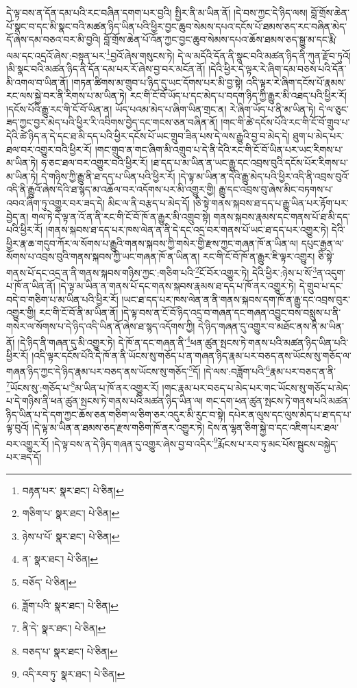 དེ་ལྟ་བས་ན་དོན་དམ་པའི་རང་བཞིན་དགག་པར་བྱའི། སྤྱིར་ནི་མ་ཡིན་ནོ། །དེ་བས་ཀྱང་དེ་ཉིད་ལས། བློ་གྲོས་ཆེན་པོ་སྣང་བ་དང་མི་སྣང་བའི་མཚན་ཉིད་ཡིན་པའི་ཕྱིར་བྱང་ཆུབ་སེམས་དཔའ་དངོས་པོ་ཐམས་ཅད་རང་བཞིན་མེད་དོ་ཞེས་དམ་བཅའ་བར་མི་བྱའི། བློ་གྲོས་ཆེན་པོ་འོན་ཀྱང་བྱང་ཆུབ་སེམས་དཔའ་ཆོས་ཐམས་ཅད་སྒྱུ་མ་དང་རྨི་ལམ་དང་འདྲའོ་ཞེས་:བསྟན་པར་\footnote{བརྟན་པར་  སྣར་ཐང་།  པེ་ཅིན། }བྱའོ་ཞེས་གསུངས་ཏེ། དེ་ལ་མདོའི་དོན་ནི་སྣང་བའི་མཚན་ཉིད་ནི་ཀུན་རྫོབ་ཏུའོ། །མི་སྣང་བའི་མཚན་ཉིད་ནི་དོན་དམ་པར་རོ་ཞེས་བྱ་བར་མངོན་ནོ། །དེའི་ཕྱིར་དེ་ལྟར་རེ་ཞིག་དམ་བཅས་པའི་དོན་མི་འགལ་བ་ཡིན་ནོ། །གཏན་ཚིགས་མ་གྲུབ་པ་ཉིད་དུ་ཡང་དོགས་པར་མི་བྱ་སྟེ། འདི་ལྟར་རེ་ཞིག་དངོས་པོ་རྣམས་རང་ལས་སྐྱེ་བར་ནི་རིགས་པ་མ་ཡིན་ཏེ། རང་གི་ངོ་བོ་ཡོད་པ་དང་མེད་པ་བདག་ཉིད་ཀྱི་རྒྱུར་མི་འཐད་པའི་ཕྱིར་རོ། །དངོས་པོའི་རྒྱུ་རང་གི་ངོ་བོ་ཡིན་ན། ཡོད་པའམ་མེད་པ་ཞིག་ཡིན་གྲང་ན། རེ་ཞིག་ཡོད་པ་ནི་མ་ཡིན་ཏེ། དེ་ལ་ཅུང་ཟད་ཀྱང་བྱར་མེད་པའི་ཕྱིར་རི་འབིགས་བྱེད་དང་གངས་ཅན་བཞིན་ནོ། །གང་གི་ཚེ་དངོས་པོའི་རང་གི་ངོ་བོ་གྲུབ་པ་དེའི་ཚེ་ཉིད་ན་དེ་དང་ཐ་མི་དད་པའི་ཕྱིར་དངོས་པོ་ཡང་གྲུབ་ཟིན་པས་དེ་ལས་རྒྱུའི་བྱ་བ་མེད་དེ། ཐུག་པ་མེད་པར་ཐལ་བར་འགྱུར་བའི་ཕྱིར་རོ། །གང་གྲུབ་ན་གང་ཞིག་མི་འགྲུབ་པ་དེ་ནི་དེའི་རང་གི་ངོ་བོ་ཡིན་པར་ཡང་རིགས་པ་མ་ཡིན་ཏེ། ཧ་ཅང་ཐལ་བར་འགྱུར་བའི་ཕྱིར་རོ། །ཐ་དད་པ་མ་ཡིན་ན་ཡང་རྒྱུ་དང་འབྲས་བུའི་དངོས་པོར་རིགས་པ་མ་ཡིན་ཏེ། དེ་གཉིས་ཀྱི་རྒྱུ་ནི་ཐ་དད་པ་ཡིན་པའི་ཕྱིར་རོ། །དེ་ལྟ་མ་ཡིན་ན་དེའི་རྒྱུ་མེད་པའི་ཕྱིར་འདི་ནི་འབྲས་བུའོ་འདི་ནི་རྒྱུའོ་ཞེས་དེའི་ཐ་སྙད་མ་འཆོལ་བར་འདོགས་པར་མི་འགྱུར་གྱི། རྒྱུ་དང་འབྲས་བུ་ཞེས་མིང་བཏགས་པ་འབའ་ཞིག་ཏུ་འགྱུར་བར་ཟད་དེ། མིང་ལ་ནི་བརྩད་པ་མེད་དོ། །ཅི་སྟེ་གནས་སྐབས་ཐ་དད་པ་རྒྱུ་ཡིན་པར་རྟོག་པར་བྱེད་ན། གལ་ཏེ་དེ་ལྟ་ན་འོ་ན་ནི་རང་གི་ངོ་བོ་ཁོ་ན་རྒྱུར་མི་འགྲུབ་སྟེ། གནས་སྐབས་རྣམས་དང་གནས་པོ་ཐ་མི་དད་པའི་ཕྱིར་རོ། །གནས་སྐབས་ཐ་དད་པར་ཁས་ལེན་ན་ནི་དེ་དང་འདྲ་བར་གནས་པོ་ཡང་ཐ་དད་པར་འགྱུར་ཏེ། དེའི་ཕྱིར་རྣ་ཆ་གདུབ་ཀོར་ལ་སོགས་པ་རྒྱུའི་གནས་སྐབས་ཀྱི་གསེར་གྱི་རྫས་ཀྱང་གཞན་ཁོ་ན་ཡིན་ལ། དཔུང་རྒྱན་ལ་སོགས་པ་འབྲས་བུའི་གནས་སྐབས་ཀྱི་ཡང་གཞན་ཁོ་ན་ཡིན་ན། རང་གི་ངོ་བོ་ཁོ་ན་རྒྱུར་ཇི་ལྟར་འགྱུར། ཅི་སྟེ་གནས་པོ་དང་འདྲ་ན་ནི་གནས་སྐབས་གཉིས་ཀྱང་:གཅིག་པའི་\footnote{གཅིག་པ་  སྣར་ཐང་།  པེ་ཅིན། }ངོ་བོར་འགྱུར་ཏེ། དེའི་ཕྱིར་:ཉེས་པ་སོ་\footnote{ཉེས་པ་པོ་  སྣར་ཐང་།  པེ་ཅིན། }ན་འདུག་པ་ཁོ་ན་ཡིན་ནོ། །དེ་ལྟ་མ་ཡིན་ན་གནས་པོ་དང་གནས་སྐབས་རྣམས་ཐ་དད་པ་ཁོ་ནར་འགྱུར་ཏེ། དེ་གྲུབ་པ་དང་བདེ་བ་གཅིག་པ་མ་ཡིན་པའི་ཕྱིར་རོ། །ཡང་ཐ་དད་པར་ཁས་ལེན་ན་ནི་གནས་སྐབས་དག་ཁོ་ན་རྒྱུ་དང་འབྲས་བུར་འགྱུར་གྱི། རང་གི་ངོ་བོ་ནི་མ་ཡིན་ནོ། །དེ་ལྟ་བས་ན་ངོ་བོ་ཉིད་འདྲ་བ་གཞན་དང་གཞན་འབྱུང་བས་བསླུས་པ་ནི་གསེར་ལ་སོགས་པ་དེ་ཉིད་འདི་ཡིན་ནོ་ཞེས་ཐ་སྙད་འདོགས་ཀྱི། དེ་ཉིད་གཞན་དུ་འགྱུར་བ་མཐོང་ནས་ནི་མ་ཡིན་ནོ། །དེ་ཉིད་ནི་གཞན་དུ་མི་འགྱུར་ཏེ། དེ་ཁོ་ན་དང་གཞན་ནི་\footnote{ན་  སྣར་ཐང་།  པེ་ཅིན། }ཕན་ཚུན་སྤངས་ཏེ་གནས་པའི་མཚན་ཉིད་ཡིན་པའི་ཕྱིར་རོ། །འདི་ལྟར་དངོས་པོའི་དེ་ཁོ་ན་ནི་ཡོངས་སུ་གཅོད་པ་ན་གཞན་ཉིད་རྣམ་པར་བཅད་ནས་ཡོངས་སུ་གཅོད་ལ་གཞན་ཉིད་ཀྱང་དེ་ཉིད་རྣམ་པར་བཅད་ནས་ཡོངས་སུ་གཅོད་\footnote{བཅོད་  པེ་ཅིན། }དོ། །དེ་ལས་:བཟློག་པའི་\footnote{ཟློག་པའི་  སྣར་ཐང་།  པེ་ཅིན། }རྣམ་པར་བཅད་ན་ནི་\footnote{ནི་དེ་  སྣར་ཐང་།  པེ་ཅིན། }ཡོངས་སུ་:གཅོད་པ་\footnote{བཅད་པ་  སྣར་ཐང་།  པེ་ཅིན། }མ་ཡིན་པ་ཁོ་ནར་འགྱུར་རོ། །གང་རྣམ་པར་བཅད་པ་མེད་པར་གང་ཡོངས་སུ་གཅོད་པ་མེད་པ་དེ་གཉིས་ནི་ཕན་ཚུན་སྤངས་ཏེ་གནས་པའི་མཚན་ཉིད་ཡིན་ལ། གང་དག་ཕན་ཚུན་སྤངས་ཏེ་གནས་པའི་མཚན་ཉིད་ཡིན་པ་དེ་དག་ཀྱང་ཆོས་ཅན་གཅིག་ལ་ཅིག་ཅར་འདུར་མི་རུང་བ་སྟེ། དཔེར་ན་ལུས་དང་ལུས་མེད་པ་ཐ་དད་པ་ལྟ་བུའོ། །དེ་ལྟ་མ་ཡིན་ན་ཐམས་ཅད་རྫས་གཅིག་ཁོ་ནར་འགྱུར་ཏེ། དེས་ན་ལྷན་ཅིག་སྐྱེ་བ་དང་འཇིག་པར་ཐལ་བར་འགྱུར་རོ། །དེ་ལྟ་བས་ན་དེ་ཉིད་གཞན་དུ་འགྱུར་ཞེས་བྱ་བ་འདིར་\footnote{འདི་རབ་ཏུ་  སྣར་ཐང་།  པེ་ཅིན། }རྨོངས་པ་རབ་ཏུ་མང་པོས་སྦུངས་བསྐྱེད་པར་ཟད་དོ། 